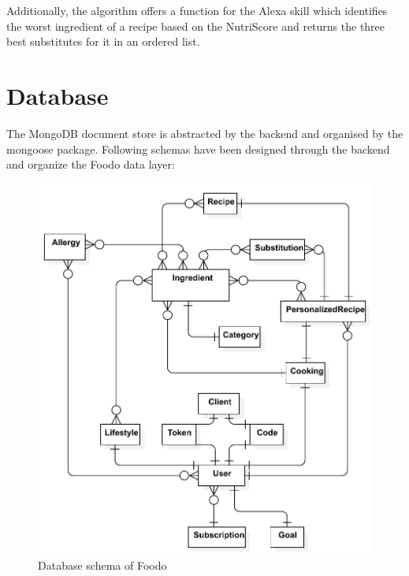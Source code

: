 Additionally, the algorithm offers a function for the Alexa skill which identifies the worst ingredient of a recipe based on the NutriScore and returns the three best substitutes for it in an ordered list. 
\clearpage
\section{Database} \label{database}
The MongoDB document store is abstracted by the backend and organised by the mongoose package. Following schemas have been designed through the backend and organize the Foodo data layer: 

\begin{figure}[ht]
	\captionsetup{justification=centering}
	\begin{center}
		\includegraphics[scale=0.7]{Ressourcen/img/db}
		\caption{Database schema of Foodo}
	\end{center}
\end{figure}

